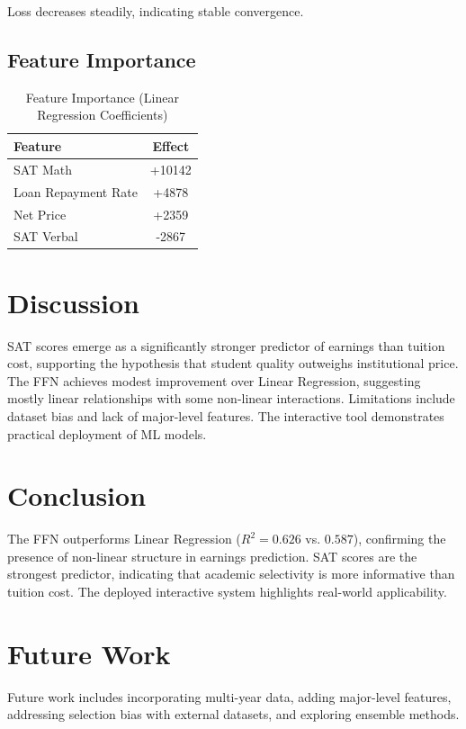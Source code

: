 \documentclass[11pt]{article}
\begin{document}
Loss decreases steadily, indicating stable convergence.

\subsection{Feature Importance}

\begin{table}[h]
\centering
\caption{Feature Importance (Linear Regression Coefficients)}
\begin{tabular}{lc}
\toprule
Feature & Effect \\
\midrule
SAT Math & +10142 \\
Loan Repayment Rate & +4878 \\
Net Price & +2359 \\
SAT Verbal & -2867 \\
\bottomrule
\end{tabular}
\end{table}

\section{Discussion}

SAT scores emerge as a significantly stronger predictor of earnings than tuition cost, supporting the hypothesis that student quality outweighs institutional price. The FFN achieves modest improvement over Linear Regression, suggesting mostly linear relationships with some non-linear interactions. Limitations include dataset bias and lack of major-level features. The interactive tool demonstrates practical deployment of ML models.

\section{Conclusion}

The FFN outperforms Linear Regression ($R^2 = 0.626$ vs. $0.587$), confirming the presence of non-linear structure in earnings prediction. SAT scores are the strongest predictor, indicating that academic selectivity is more informative than tuition cost. The deployed interactive system highlights real-world applicability.

\section{Future Work}

Future work includes incorporating multi-year data, adding major-level features, addressing selection bias with external datasets, and exploring ensemble methods.
\end{document}
